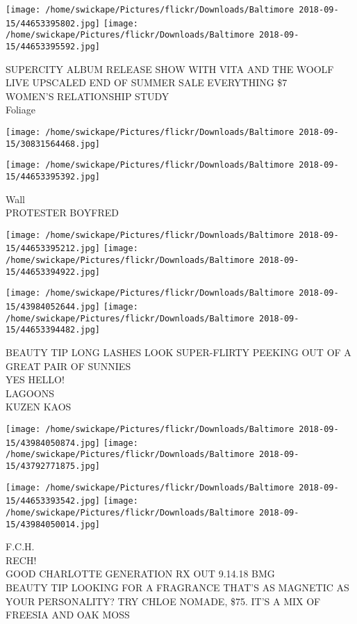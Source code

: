 \documentclass[10pt,letterpaper]{article}
\begin{document}
\texttt{[image: /home/swickape/Pictures/flickr/Downloads/Baltimore 2018-09-15/44653395802.jpg]}
\texttt{[image: /home/swickape/Pictures/flickr/Downloads/Baltimore 2018-09-15/44653395592.jpg]}

SUPERCITY ALBUM RELEASE SHOW WITH VITA AND THE WOOLF\\
LIVE UPSCALED END OF SUMMER SALE EVERYTHING \$7\\
WOMEN'S RELATIONSHIP STUDY\\
Foliage
\pagebreak

\texttt{[image: /home/swickape/Pictures/flickr/Downloads/Baltimore 2018-09-15/30831564468.jpg]}

\vspace{0.25in}
\texttt{[image: /home/swickape/Pictures/flickr/Downloads/Baltimore 2018-09-15/44653395392.jpg]}

Wall\\
PROTESTER BOYFRED
\pagebreak

\texttt{[image: /home/swickape/Pictures/flickr/Downloads/Baltimore 2018-09-15/44653395212.jpg]}
\texttt{[image: /home/swickape/Pictures/flickr/Downloads/Baltimore 2018-09-15/44653394922.jpg]}

\texttt{[image: /home/swickape/Pictures/flickr/Downloads/Baltimore 2018-09-15/43984052644.jpg]}
\texttt{[image: /home/swickape/Pictures/flickr/Downloads/Baltimore 2018-09-15/44653394482.jpg]}

BEAUTY TIP LONG LASHES LOOK SUPER{-}FLIRTY PEEKING OUT OF A GREAT PAIR OF SUNNIES\\
YES HELLO!\\
LAGOONS\\
KUZEN KAOS
\pagebreak

\texttt{[image: /home/swickape/Pictures/flickr/Downloads/Baltimore 2018-09-15/43984050874.jpg]}
\texttt{[image: /home/swickape/Pictures/flickr/Downloads/Baltimore 2018-09-15/43792771875.jpg]}

\texttt{[image: /home/swickape/Pictures/flickr/Downloads/Baltimore 2018-09-15/44653393542.jpg]}
\texttt{[image: /home/swickape/Pictures/flickr/Downloads/Baltimore 2018-09-15/43984050014.jpg]}

F.C.H.\\
RECH!\\
GOOD CHARLOTTE GENERATION RX OUT 9.14.18 BMG\\
BEAUTY TIP LOOKING FOR A FRAGRANCE THAT'S AS MAGNETIC AS YOUR PERSONALITY?  TRY CHLOE NOMADE, \$75.  IT'S A MIX OF FREESIA AND OAK MOSS
\pagebreak
\end{document}
